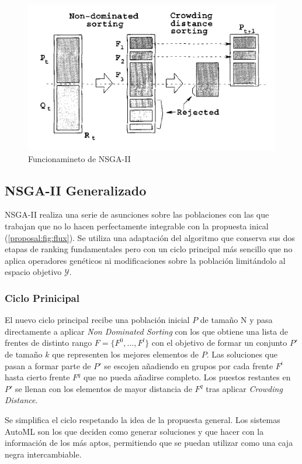 \begin{figure}[ht]
    \centering
    \includegraphics[scale=0.5]{Pictures/nsga2.png}
    \caption{Funcionamineto de NSGA-II}
    \label{proposal:fig:nsga2}
\end{figure}

\subsection{NSGA-II Generalizado}

NSGA-II realiza una serie de asunciones sobre las poblaciones con las que trabajan que no lo hacen perfectamente integrable con la propuesta inical (\ref{proposal:fig:flux}). Se utiliza una adaptaci\'on del algoritmo que conserva sus dos etapas de ranking fundamentales pero con un ciclo principal m\'as sencillo que no aplica operadores gen\'eticos ni modificaciones sobre la poblaci\'on limit\'andolo al espacio objetivo $\mathcal{Y}$.

\subsubsection{Ciclo Prinicipal}
El nuevo ciclo principal recibe una poblaci\'on inicial $P$ de tama\~no N y pasa directamente a aplicar \textit{Non Dominated Sorting} con los que obtiene una lista de frentes de distinto rango $F = \{F^0, ..., F^l\}$ con el objetivo de formar un conjunto $P'$ de tama\~no $k$ que representen los mejores elementos de $P$. Las soluciones que pasan a formar parte de $P'$ se escojen a\~nadiendo en grupos por cada frente $F^i$ hasta cierto frente $F^q$ que no pueda a\~nadirse completo. Los puestos restantes en $P'$ se llenan con los elementos de mayor distancia de $F^q$ tras aplicar \textit{Crowding Distance}.

Se simplifica el ciclo respetando la idea de la propuesta general.  Los sistemas AutoML son los que deciden como generar soluciones y que hacer con la informaci\'on de los m\'as aptos, permitiendo que se puedan utilizar como una caja negra intercambiable.
